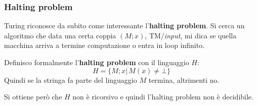 \subsubsection{Halting problem}
Turing riconosce da subito come interessante l'\textbf{halting problem}. Si
cerca un algoritmo che data una certa coppia $(M;x)$, TM/\textit{input}, mi dica se
quella macchina arriva a termine computazione o entra in loop infinito.
\begin{definizione}
  Definisco formalmente l'\textbf{halting problem} con il linguaggio $H$:
  \[H=\{M;x|\,M(x)\neq\bot\}\]
  Quindi se la stringa fa parte del linguaggio $M$ termina, altrimenti no.
\end{definizione}
\begin{definizione}
  Si ottiene però che $H$ non è ricorsivo e quindi l'halting problem non è
  decidibile.
\end{definizione}
